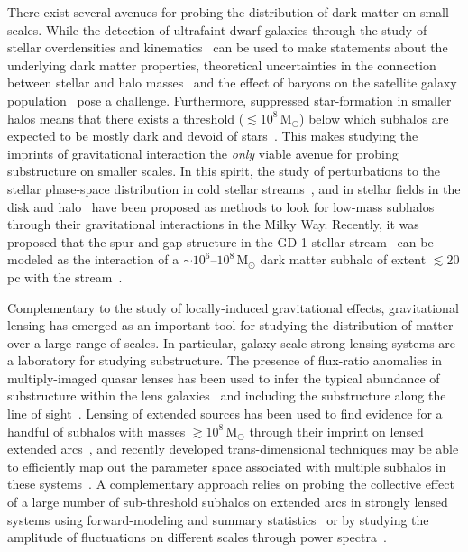 \documentclass[prd,aps,10pt,nofootinbib,twocolumn,superscriptaddress,preprintnumbers,balancelastpage,longbibliography]{revtex4-1}
\begin{document}
There exist several avenues for probing the distribution of dark matter on small scales. While the detection of ultrafaint dwarf galaxies through the study of stellar overdensities and kinematics~\cite{1503.02584,0706.2687,1503.02079} can be used to make statements about the underlying dark matter properties, theoretical uncertainties in the connection between stellar and halo masses~\cite{1804.03097} and the effect of baryons on the satellite galaxy population~\cite{1812.00044,1811.11791,1701.03792,1608.01849} pose a challenge. Furthermore, suppressed star-formation in smaller halos means that there exists a threshold ($\lesssim 10^8\,\mathrm{M}_\odot$) below which subhalos are expected to be mostly dark and devoid of stars~\cite{1992MNRAS.256P..43E,1611.02281,1607.03127}. This makes studying the imprints of gravitational interaction the \emph{only} viable avenue for probing substructure on smaller scales. In this spirit, the study of perturbations to the stellar phase-space distribution in cold stellar streams~\cite{1804.06854,astro-ph/9807243,1109.6022}, and in stellar fields in the disk and halo~\cite{1711.03554} have been proposed as methods to look for low-mass subhalos through their gravitational interactions in the Milky Way. Recently, it was proposed that the spur-and-gap structure in the GD-1 stellar stream~\cite{1303.4342} can be modeled as the interaction of a $\sim10^{6}$--$10^{8}\,\mathrm M_\odot$ dark matter subhalo of extent $\lesssim 20$\,pc with the stream~\cite{1811.03631}.

Complementary to the study of locally-induced gravitational effects, gravitational lensing has emerged as an important tool for studying the distribution of matter over a large range of scales. In particular, galaxy-scale strong lensing systems are a laboratory for studying substructure. The presence of flux-ratio anomalies in multiply-imaged quasar lenses has been used to infer the typical abundance of substructure within the lens galaxies~\cite{astro-ph/0111456} and including the substructure along the line of sight~\cite{1905.04182}. Lensing of extended sources has been used to find evidence for a handful of subhalos with masses $\gtrsim 10^8\,\mathrm{M}_\odot$ through their imprint on lensed extended arcs~\cite{1601.01388,0910.0760,1201.3643}, and recently developed trans-dimensional techniques may be able to efficiently map out the parameter space associated with multiple subhalos in these systems~\cite{1508.00662,1706.06111}. A complementary approach relies on probing the collective effect of a large number of sub-threshold subhalos on extended arcs in strongly lensed systems using forward-modeling and summary statistics~\cite{1702.00009} or by studying the amplitude of fluctuations on different scales through power spectra~\cite{1403.2720,1809.00004,1707.04590,1806.07897,1808.03501,1710.03075,1506.01724}.  
\end{document}
